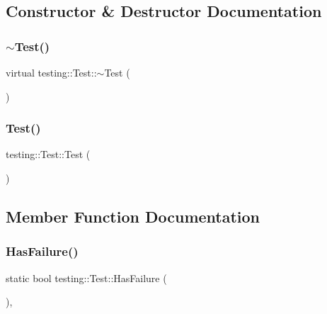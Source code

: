 \subsection{Constructor \& Destructor Documentation}
\mbox{\label{classtesting_1_1_test_ad99dc9b12208fd4bffc367f0a1e3df1b}} 
\subsubsection{\texorpdfstring{$\sim$Test()}{~Test()}}
{\footnotesize\ttfamily virtual testing\+::\+Test\+::$\sim$\+Test (\begin{DoxyParamCaption}{ }\end{DoxyParamCaption})\hspace{0.3cm}{\ttfamily [virtual]}}

\mbox{\label{classtesting_1_1_test_a68b7618abd1fc6d13382738b0d3b5c7c}} 
\subsubsection{\texorpdfstring{Test()}{Test()}}
{\footnotesize\ttfamily testing\+::\+Test\+::\+Test (\begin{DoxyParamCaption}{ }\end{DoxyParamCaption})\hspace{0.3cm}{\ttfamily [protected]}}



\subsection{Member Function Documentation}
\mbox{\label{classtesting_1_1_test_a7a00be7dd0a6bfdc8d47a1b784623613}} 
\subsubsection{\texorpdfstring{HasFailure()}{HasFailure()}}
{\footnotesize\ttfamily static bool testing\+::\+Test\+::\+Has\+Failure (\begin{DoxyParamCaption}{ }\end{DoxyParamCaption})\hspace{0.3cm}{\ttfamily [inline]}, {\ttfamily [static]}}

